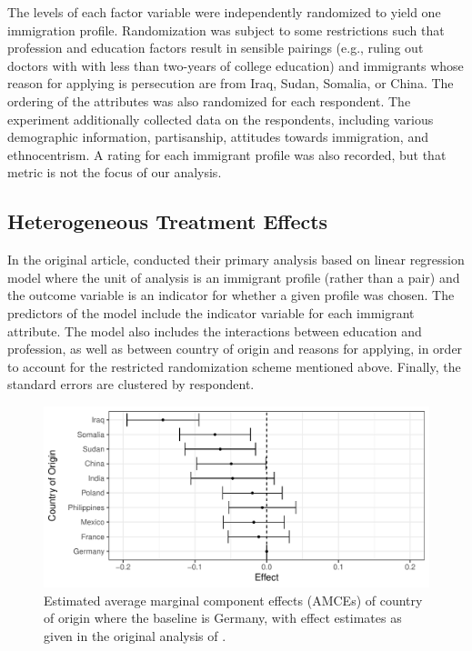 \documentclass[11pt]{article}
\newcommand\spacingset[1]{\renewcommand{\baselinestretch}%
  {#1}\small\normalsize}
\begin{document}
The levels of each factor variable were independently randomized to
yield one immigration profile.  Randomization was subject to some
restrictions such that profession and education factors result in
sensible pairings (e.g., ruling out doctors with with less than
two-years of college education) and immigrants whose reason for
applying is persecution are from Iraq, Sudan, Somalia, or China.  The
ordering of the attributes was also randomized for each respondent.
The experiment additionally collected data on the respondents,
including various demographic information, partisanship, attitudes
towards immigration, and ethnocentrism.  A rating for each immigrant
profile was also recorded, but that metric is not the focus of our
analysis.


\subsection{Heterogeneous Treatment Effects}

In the original article, \cite{hainmueller2015hidden} conducted their
primary analysis based on linear regression model where the unit of
analysis is an immigrant profile (rather than a pair) and the outcome
variable is an indicator for whether a given profile was chosen.  The
predictors of the model include the indicator variable for each
immigrant attribute.  The model also includes the interactions between
education and profession, as well as between country of origin and
reasons for applying, in order to account for the restricted
randomization scheme mentioned above.  Finally, the standard errors
are clustered by respondent.

\begin{figure}[t]
\centering \spacingset{1}
\includegraphics[width=\textwidth]{figures/hh_2015_pooled.pdf}
\caption{Estimated average marginal component effects (AMCEs) of
  country of origin where the baseline is Germany, with effect estimates as given in the original analysis of
  \cite{hainmueller2015hidden}.} \label{fig:hhy_country_est}
\end{figure}
\end{document}

